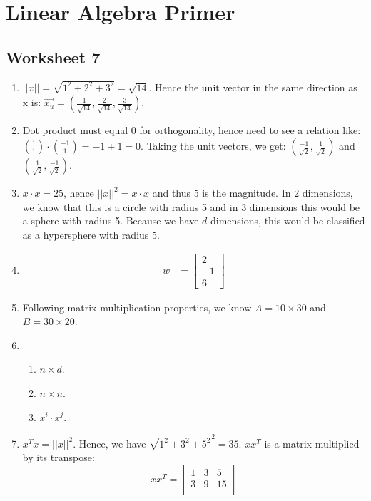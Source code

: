 \documentclass[12pt]{article}
\theoremstyle{plain}
\theoremstyle{definition}
\numberwithin{equation}{theorem}
\begin{document}
\section{Linear Algebra Primer}
\subsection{Worksheet 7}
\begin{enumerate}
\item $||x|| = \sqrt{1^{2}+2^{2}+3^{2}} = \sqrt{14}$. Hence the unit vector in the same direction as x is: $\vec{x_{u}} = (\frac{1}{\sqrt{14}},\frac{2}{\sqrt{14}},\frac{3}{\sqrt{14}})$.
\item Dot product must equal 0 for orthogonality, hence need to see a relation like: $\binom{1}{1}\cdot \binom{-1}{1} = -1+1 = 0$. Taking the unit vectors, we get: $(\frac{-1}{\sqrt{2}},\frac{1}{\sqrt{2}})$ and $(\frac{1}{\sqrt{2}},\frac{-1}{\sqrt{2}})$.
\item $x\cdot x = 25$, hence $||x||^{2}=x \cdot x$ and thus 5 is the magnitude. In 2 dimensions, we know that this is a circle with radius 5 and in 3 dimensions this would be a sphere with radius 5. Because we have $d$ dimensions, this would be classified as a hypersphere with radius 5.
\item 
\begin{align}
    w &= \begin{bmatrix}
           2 \\
           -1 \\
           6
         \end{bmatrix}
 \end{align}
\item Following matrix multiplication properties, we know $A = 10 \times 30$ and $B = 30 \times 20$.
\item
	\begin{enumerate}
	\item $n \times d$.
	\item $n \times n$.
	\item $x^{i} \cdot x^{j}$.
	\end{enumerate}
\addtocounter{enumi}{1}
\item $x^{T}x = ||x||^{2}$. Hence, we have $\sqrt{1^{2}+3^{2}+5^{2}}^{2} = 35$. $xx^{T}$ is a matrix multiplied by its transpose:\\
	\[
xx^{T}=
  \begin{bmatrix}
    1 & 3 & 5 \\
    3 & 9 & 15 \\

\end{bmatrix}\]
\end{enumerate}
\end{document}
